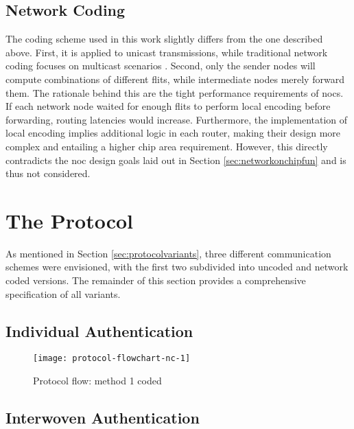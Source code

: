 \subsection{Network Coding}\label{sec:designnc}
The coding scheme used in this work slightly differs from the one described above. First, it is applied to unicast transmissions, while traditional
network coding focuses on multicast scenarios \cites{ahlswede00networkflow}{li03linearnc}. Second, only the sender nodes will compute combinations of
different flits, while intermediate nodes merely forward them. The rationale behind this are the tight performance requirements of \glspl{noc}. If
each network node waited for enough flits to perform local encoding before forwarding, routing latencies would increase. Furthermore, the
implementation of local encoding implies additional logic in each router, making their design more complex and entailing a higher chip area
requirement. However, this directly contradicts the \gls{noc} design goals laid out in Section \ref{sec:networkonchipfun} and is thus not considered.

\section{The Protocol}\label{sec:theprotocol}
As mentioned in Section \ref{sec:protocolvariants}, three different communication schemes were envisioned, with the first two subdivided into uncoded
and network coded versions. The remainder of this section provides a comprehensive specification of all variants.

\subsection{Individual Authentication}
\begin{figure}
    \centering
    \texttt{[image: protocol-flowchart-nc-1]}
    \caption[Protocol flow: method 1 coded]{Protocol flow: method 1 coded}
    \label{fig:protchartnc1}
\end{figure}

\subsection{Interwoven Authentication}

